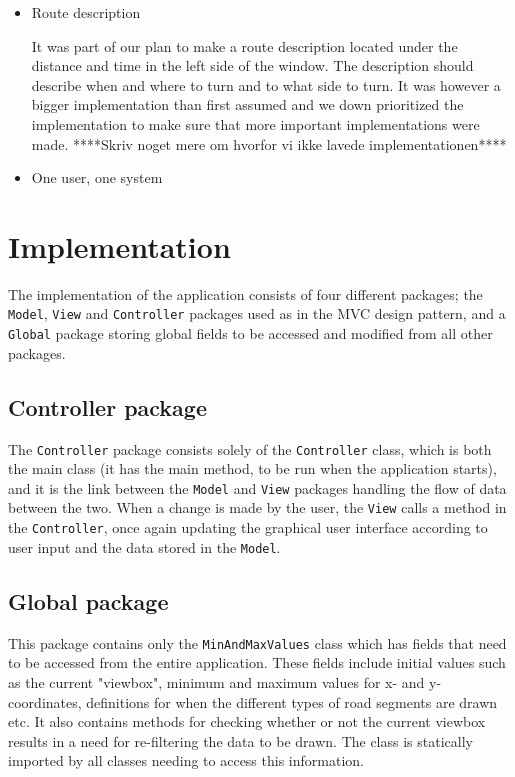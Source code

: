 \documentclass[a4paper,11pt]{article}
\begin{document}
\begin{itemize}
\begin{itemize}
		\item Route description

		    It was part of our plan to make a route description located under the distance and time in the left side of the window. The description should describe when and where to turn and to what side to turn. It was however a bigger implementation than first assumed and we down prioritized the implementation to make sure that more important implementations were made. ****Skriv noget mere om hvorfor vi ikke lavede implementationen**** 
		\item One user, one system
	\end{itemize}
\end{itemize}

\pagebreak
\section{Implementation}
\label{sec:Implementation}
The implementation of the application consists of four different packages; the \texttt{Model}, \texttt{View} and \texttt{Controller} packages used as in the MVC design pattern, and a \texttt{Global} package storing global fields to be accessed and modified from all other packages.

\subsection{Controller package} %
The \texttt{Controller} package consists solely of the \texttt{Controller} class, which is both the main class (it has the main method, to be run when the application starts), and it is the link between the \texttt{Model} and \texttt{View} packages handling the flow of data between the two. When a change is made by the user, the \texttt{View} calls a method in the \texttt{Controller}, once again updating the graphical user interface according to user input and the data stored in the \texttt{Model}.

\subsection{Global package} %
This package contains only the \texttt{MinAndMaxValues} class which has fields that need to be accessed from the entire application. These fields include initial values such as the current "viewbox", minimum and maximum values for x- and y-coordinates, definitions for when the different types of road segments are drawn etc. It also contains methods for checking whether or not the current viewbox results in a need for re-filtering the data to be drawn. The class is statically imported by all classes needing to access this information.
\end{document}
